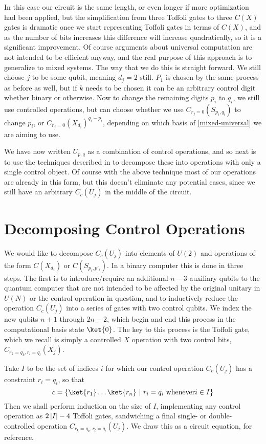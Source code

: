 In this case our circuit is the same length, or even longer if more optimization had been applied, but the simplification from three Toffoli gates to three $C(X)$ gates is dramatic once we start representing Toffoli gates in terms of $C(X)$, and as the number of bits increases this difference will increase quadratically, so it is a significant improvement. Of course arguments about universal computation are not intended to be efficient anyway, and the real purpose of this approach is to generalize to mixed systems. The way that we do this is straight forward. We still choose $j$ to be some qubit, meaning $d_j = 2$ still. $P_1$ is chosen by the same process as before as well, but if $k$ needs to be chosen it can be an arbitrary control digit whether binary or otherwise. Now to change the remaining digits $p_i$ to $q_i$, we still use controlled operations, but can choose whether we use $C_{r_j=0}(S_{p_i,q_i})$ to change $p_i$, or $C_{r_j=0}(X_{d_i})^{q_i-p_i}$, depending on which basis of \autoref{mixed-universal} we are aiming to use.

We have now written $U_{p,q}$ as a combination of control operations, and so next is to use the techniques described in \cite{cnot-decomposition} to decompose these into operations with only a single control object. Of course with the above technique most of our operations are already in this form, but this doesn't eliminate any potential cases, since we still have an arbitrary $C_c(U_j)$ in the middle of the circuit.

\section{Decomposing Control Operations}
We would like to decompose $C_c(U_j)$ into elements of $U(2)$ and operations of the form $C(X_{d_i})$ or $C(S_{p_i,p'_i})$. In a binary computer this is done in three steps. The first is to introduce/require an additional $n-3$ auxiliary qubits to the quantum computer that are not intended to be affected by the original unitary in $U(N)$ or the control operation in question, and to inductively reduce the operation $C_c(U_j)$ into a series of gates with two control qubits. We index the new qubits $n+1$ through $2n-2$, which begin and end this process in the computational basis state $\ket{0}$. The key to this process is the Toffoli gate, which we recall is simply a controlled $X$ operation with two control bits, $C_{r_k=q_k,r_l=q_l}(X_j)$.

Take $I$ to be the set of indices $i$ for which our control operation $C_c(U_j)$ has a constraint $r_i = q_i$, so that
\[c = \{\ket{r_1}\dots\ket{r_n}\ |\ r_i = q_i \text{\ whenever} i \in I\}\]
Then we shall perform induction on the size of $I$, implementing any control operation as $2\left| I \right|-4$ Toffoli gates, sandwiching a final single- or double-controlled operation $C_{r_k=q_k, r_l=q_l}(U_j)$. We draw this as a circuit equation, for reference.


